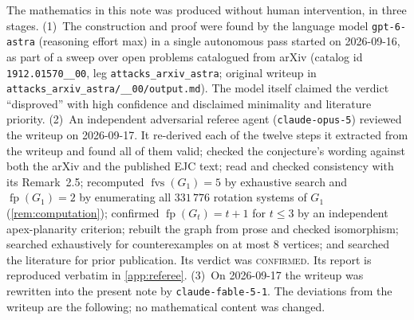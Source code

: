 \documentclass[11pt,a4paper]{article}
\theoremstyle{plain}
\theoremstyle{definition}
\theoremstyle{remark}
\newcommand{\fvs}{\operatorname{fvs}}
\newcommand{\fp}{\operatorname{fp}}
\newcommand{\Gtt}{G_t}
\begin{document}
The mathematics in this note was produced without human intervention, in three stages.
(1)~The construction and proof were found by the language model \texttt{gpt-6-astra} (reasoning effort max) in a single autonomous pass started on 2026-09-16, as part of a sweep over open problems catalogued from arXiv (catalog id \texttt{1912.01570\_\_00}, leg \texttt{attacks\_arxiv\_astra}; original writeup in \texttt{attacks\_arxiv\_astra/\_\_00/\allowbreak output.md}). The model itself claimed the verdict ``disproved'' with high confidence and disclaimed minimality and literature priority.
(2)~An independent adversarial referee agent (\texttt{claude-opus-5}) reviewed the writeup on 2026-09-17. It re-derived each of the twelve steps it extracted from the writeup and found all of them valid; checked the conjecture's wording against both the arXiv and the published EJC text; read \cite{BG24} and checked consistency with its Remark~2.5; recomputed $\fvs(G_1)=5$ by exhaustive search and $\fp(G_1)=2$ by enumerating all $331\,776$ rotation systems of $G_1$ (\cref{rem:computation}); confirmed $\fp(\Gtt)=t+1$ for $t\le3$ by an independent apex-planarity criterion; rebuilt the graph from prose and checked isomorphism; searched exhaustively for counterexamples on at most $8$ vertices; and searched the literature for prior publication. Its verdict was \textsc{confirmed}. Its report is reproduced verbatim in \cref{app:referee}.
(3)~On 2026-09-17 the writeup was rewritten into the present note by \texttt{claude-fable-5-1}. The deviations from the writeup are the following; no mathematical content was changed.
\end{document}
